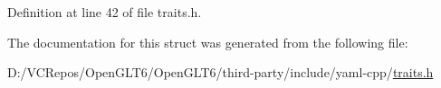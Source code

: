Definition at line 42 of file traits.\+h.



The documentation for this struct was generated from the following file\+:\begin{DoxyCompactItemize}
\item 
D\+:/\+V\+C\+Repos/\+Open\+G\+L\+T6/\+Open\+G\+L\+T6/third-\/party/include/yaml-\/cpp/\mbox{\hyperlink{traits_8h}{traits.\+h}}\end{DoxyCompactItemize}
